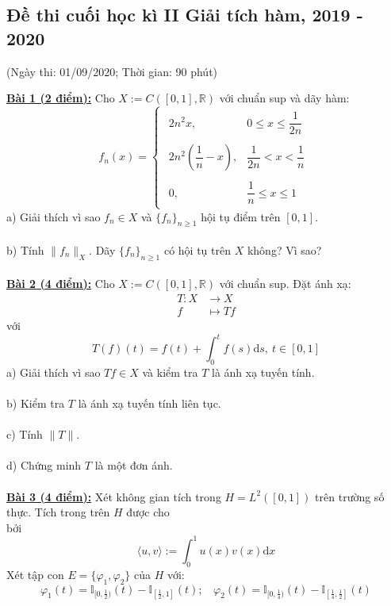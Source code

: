 \documentclass[10pt, a4paper]{article}
\begin{document}
\subsection{Đề thi cuối học kì II Giải tích hàm, 2019 - 2020}
\begin{center}
	\color{blue}(Ngày thi: 01/09/2020; Thời gian: 90 phút)
\end{center}
\color{red}\underline{\textbf{Bài 1 (2 điểm):}} \color{black}Cho $X:=C([0,1],\mathbb R)$ với chuẩn sup và dãy hàm: $$f_n(x)=\begin{cases}
\begin{array}{ll}
	2n^2x, & 0\le x\le\dfrac{1}{2n}\\\\
	2n^2\left(\dfrac1n-x\right), & \dfrac{1}{2n}<x<\dfrac1n\\\\
	0, & \dfrac1n\le x\le1
\end{array}
\end{cases}$$
\color{red}a) \color{black}Giải thích vì sao $f_n\in X$ và $\{f_n\}_{n\ge1}$ hội tụ điểm trên $[0,1]$.\\\\
\color{red}b) \color{black}Tính $\lVert f_n\rVert_X.$ Dãy $\{f_n\}_{n\ge1}$ có hội tụ trên $X$ không? Vì sao?\\\\
\color{red}\underline{\textbf{Bài 2 (4 điểm):}} \color{black}Cho $X:=C([0,1],\mathbb R)$ với chuẩn sup. Đặt ánh xạ: \begin{align*}
	T:X&\rightarrow X\\
	f&\mapsto Tf
\end{align*} với $$T(f)(t)=f(t)+\displaystyle\int_0^tf(s)\text{d}s,~t\in[0,1]$$
\color{red}a) \color{black}Giải thích vì sao $Tf\in X$ và kiểm tra $T$ là ánh xạ tuyến tính.\\\\
\color{red}b) \color{black}Kiểm tra $T$ là ánh xạ tuyến tính liên tục.\\\\
\color{red}c) \color{black}Tính $\lVert T\rVert$.\\\\
\color{red}d) \color{black}Chứng minh $T$ là một đơn ánh.\\\\
\color{red}\underline{\textbf{Bài 3 (4 điểm):}} \color{black}Xét không gian tích trong $H=L^2([0,1])$ trên trường số thực. Tích trong trên $H$ được cho\\ bởi $$\langle u,v\rangle:=\displaystyle\int_0^1u(x)v(x)\text{d}x$$ Xét tập con $E=\{\varphi_1,\varphi_2\}$ của $H$ với: $$\varphi_1(t)=\mathbb I_{[0,\frac12)}(t)-\mathbb I_{\left[\frac12,1\right]}(t);~~~~\varphi_2(t)=\mathbb I_{[0,\frac14)}(t)-\mathbb I_{\left[\frac14,\frac12\right]}(t)$$
\end{document}
